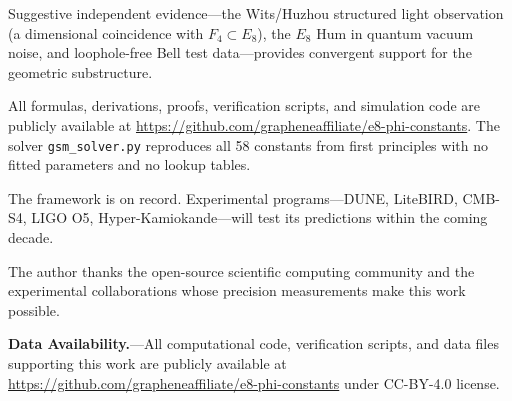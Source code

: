 \documentclass[aps,prd,twocolumn,superscriptaddress,nofootinbib,showpacs]{revtex4-2}
\begin{document}
Suggestive independent evidence---the Wits/Huzhou structured light
observation (a dimensional coincidence with $F_4 \subset E_8$), the
$E_8$ Hum in quantum vacuum noise, and loophole-free Bell test
data---provides convergent support for the geometric substructure.

All formulas, derivations, proofs, verification scripts, and
simulation code are publicly available at
\url{https://github.com/grapheneaffiliate/e8-phi-constants}.  The
solver \texttt{gsm\_solver.py} reproduces all 58 constants from first
principles with no fitted parameters and no lookup tables.

The framework is on record.  Experimental programs---DUNE, LiteBIRD,
CMB-S4, LIGO O5, Hyper-Kamiokande---will test its predictions within
the coming decade.

\begin{acknowledgments}
The author thanks the open-source scientific computing community and
the experimental collaborations whose precision measurements make this
work possible.
\end{acknowledgments}


\textbf{Data Availability.}---All computational code, verification
scripts, and data files supporting this work are publicly available at
\url{https://github.com/grapheneaffiliate/e8-phi-constants} under
CC-BY-4.0 license.
\end{document}
